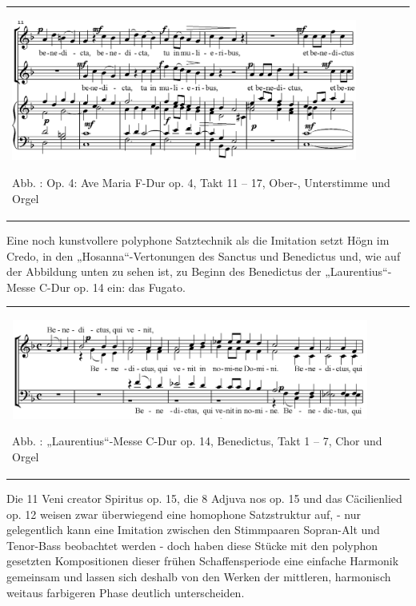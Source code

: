 \documentclass[a4paper]{article}
\newcounter{Abb}
\renewcommand\theAbb{\arabic{Abb}}
\begin{document}
\begin{center}
\tablefirsthead{}
\tablehead{}
\tabletail{}
\tablelasttail{}
\begin{supertabular}{m{11.565001cm}}

\includegraphics[width=11.382cm,height=4.658cm]{pictures/zulassungsarbeit-img095.png}

Abb. \stepcounter{Abb}{\theAbb}: Op. 4: Ave Maria F-Dur op. 4, Takt 11 –
17, Ober-, Unterstimme und Orgel\\
\end{supertabular}
\end{center}
Eine noch kunstvollere polyphone Satztechnik als die Imitation setzt
Högn im Credo, in den „Hosanna“-Vertonungen des Sanctus und Benedictus
und, wie auf der Abbildung unten zu sehen ist, zu Beginn des Benedictus
der „Laurentius“-Messe C-Dur op. 14 ein: das Fugato.

\begin{center}
\tablefirsthead{}
\tablehead{}
\tabletail{}
\tablelasttail{}
\begin{supertabular}{m{11.948cm}}

\includegraphics[width=11.765cm,height=3.267cm]{pictures/zulassungsarbeit-img096.png}

Abb. \stepcounter{Abb}{\theAbb}: „Laurentius“-Messe C-Dur op. 14,
Benedictus, Takt 1 – 7, Chor und Orgel\\
\end{supertabular}
\end{center}
Die 11 Veni creator Spiritus op. 15, die 8 Adjuva nos op. 15 und das
Cäcilienlied op. 12 weisen zwar überwiegend eine homophone Satzstruktur
auf, - nur gelegentlich kann eine Imitation zwischen den Stimmpaaren
Sopran-Alt und Tenor-Bass beobachtet werden - doch haben diese Stücke
mit den polyphon gesetzten Kompositionen dieser frühen Schaffensperiode
eine einfache Harmonik gemeinsam und lassen sich deshalb von den Werken
der mittleren, harmonisch weitaus farbigeren Phase deutlich
unterscheiden.
\end{document}
